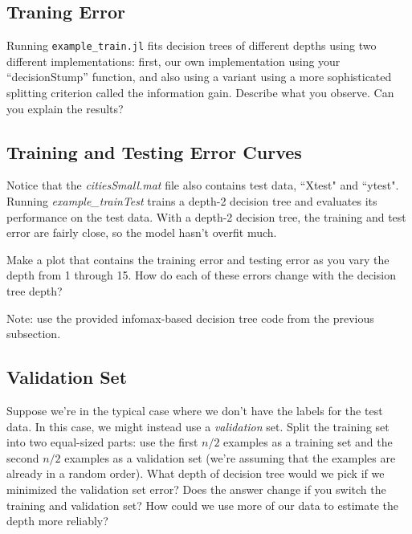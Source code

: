 \documentclass{article}
\def\blu#1{{\color{blu}#1}}
\begin{document}
\subsection{Traning Error}

Running \texttt{example\_train.jl} fits decision trees of different depths using two different implementations: first,
our own implementation using your ``decisionStump'' function, and also using a variant using a more sophisticated splitting criterion called the information gain. \blu{Describe what you observe. Can you explain the results?}



\subsection{Training and Testing Error Curves}

Notice that the \emph{citiesSmall.mat} file also contains test data, ``Xtest" and ``ytest". 
Running \emph{example\_trainTest} trains a depth-2 decision tree and evaluates its performance on the test data. %
With a depth-2 decision tree, the training and test error are fairly close, so the model hasn't overfit much.


\blu{Make a plot that contains the training error and testing error as you vary the depth from 1 through 15. How do each of these errors change with the decision tree depth?}

Note: use the provided infomax-based decision tree code from the previous subsection.



\subsection{Validation Set}

Suppose we're in the typical case where we don't have the labels for the test data. In this case, we might instead use a \emph{validation} set. Split the training set into two equal-sized parts: use the first $n/2$ examples as a training set and the second $n/2$ examples as a validation set (we're assuming that the examples are already in a random order). \blu{What depth of decision tree would we pick if we minimized the validation set error? Does the answer change if you switch the training and validation set? How could we use more of our data to  estimate the depth more reliably?}
\end{document}
